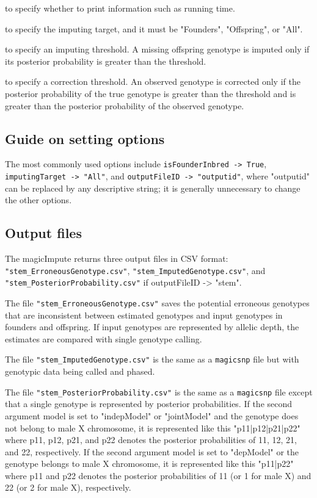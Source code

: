 \documentclass[12pt]{article}
\begin{document}
\begin{description}[noitemsep]
\item[isPrintTimeElapsed -> True] to specify whether to print information such as running time. 
\item[imputingTarget -> "All"] to specify the imputing target, and it must be "Founders", "Offspring", or "All". 
\item[imputingThreshold -> 0.9] to specify an imputing threshold. A missing offspring genotype is imputed only if its posterior probability is greater than the threshold.
\item[detectingThreshold -> 0.9] to specify a correction threshold. An observed genotype is corrected only if the posterior probability of the true genotype is greater than the threshold and is greater than the posterior probability of the observed genotype.
\end{description}

\subsection{Guide on setting options}

The most commonly used options include \verb|isFounderInbred -> True|, \\
\verb|imputingTarget -> "All"|, and \verb|outputFileID -> "outputid"|, where "outputid" can be replaced by any descriptive string; it is generally unnecessary to change the other options.  

\subsection{Output files}

The magicImpute returns three output files in CSV format: \verb|"stem_ErroneousGenotype.csv"|, \verb|"stem_ImputedGenotype.csv"|, and \verb|"stem_PosteriorProbability.csv"| if outputFileID -> "stem". 

The file \verb|"stem_ErroneousGenotype.csv"| saves the potential erroneous genotypes that are inconsistent between estimated genotypes and input genotypes in founders and offspring.  If input genotypes are represented by allelic depth, the estimates are compared with single genotype calling.

The file \verb|"stem_ImputedGenotype.csv"| is the same as a \verb|magicsnp| file but with genotypic data being called and phased. 

The file \verb|"stem_PosteriorProbability.csv"| is the same as  a \verb|magicsnp| file  except that a single genotype is represented by posterior probabilities. If the second argument model is set to "indepModel" or "jointModel" and the genotype does not belong to male X chromosome, it is represented like this "p11|p12|p21|p22" where p11, p12, p21, and p22 denotes the posterior probabilities of 11, 12, 21, and 22, respectively. If the second argument model is set to "depModel" or the genotype belongs to male X chromosome, it is represented like this "p11|p22" where p11 and p22 denotes the posterior probabilities of 11 (or 1 for male X) and 22 (or 2 for male X), respectively.  
\end{document}
